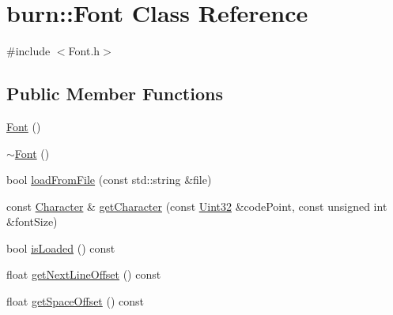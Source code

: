 \hypertarget{classburn_1_1_font}{\section{burn\-:\-:Font Class Reference}
\label{classburn_1_1_font}
}


{\ttfamily \#include $<$Font.\-h$>$}

\subsection*{Public Member Functions}
\begin{DoxyCompactItemize}
\item 
\hyperlink{classburn_1_1_font_a5e89a49100bd01b72b95ad26c869a4c8}{Font} ()
\item 
\hyperlink{classburn_1_1_font_adbdef3544e8d1925de8b1305e1e990d3}{$\sim$\-Font} ()
\item 
bool \hyperlink{classburn_1_1_font_a0788de2b9685bd41482124efada486f3}{load\-From\-File} (const std\-::string \&file)
\item 
const \hyperlink{classburn_1_1_character}{Character} \& \hyperlink{classburn_1_1_font_a25b92e02bf9a20eb1c78ba415c14c765}{get\-Character} (const \hyperlink{namespaceburn_ab40b09022209bd449d317c1f0e95356b}{Uint32} \&code\-Point, const unsigned int \&font\-Size)
\item 
bool \hyperlink{classburn_1_1_font_a46ffb674f4f8f3245feccda520750e8e}{is\-Loaded} () const 
\item 
float \hyperlink{classburn_1_1_font_a779fa753f88cb28668ab143ec313e7d0}{get\-Next\-Line\-Offset} () const 
\item 
float \hyperlink{classburn_1_1_font_abea302cec9ab9610328e5b43d7b188c7}{get\-Space\-Offset} () const 
\end{DoxyCompactItemize}


